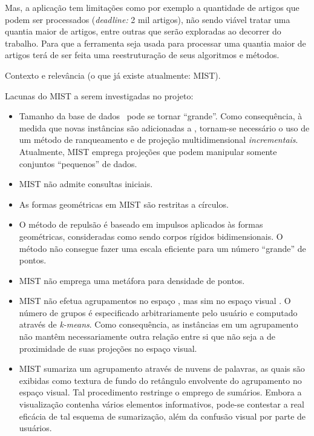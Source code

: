  Mas, a aplicação tem limitações como por exemplo a quantidade de artigos que podem ser processados (\textit{deadline:} 2 mil artigos), não sendo viável tratar uma quantia maior de artigos, entre outras que serão exploradas ao decorrer do trabalho. Para que a ferramenta seja usada para processar uma quantia maior de artigos terá de ser feita uma reestruturação de seus algoritmos e métodos.

Contexto e relevância (o que já existe atualmente: MIST).

Lacunas do MIST a serem investigadas no projeto:
\begin{itemize}
	\item Tamanho da base de dados \DB\ pode se tornar ``grande''. Como consequência, à medida que novas instâncias são adicionadas a \DB,
	tornam-se necessário o uso de um método de ranqueamento e de projeção
	multidimensional \emph{incrementais}. Atualmente, MIST emprega
	projeções que podem manipular somente conjuntos ``pequenos'' de
	dados.
	
	\item MIST não admite consultas iniciais.
	
	\item As formas geométricas em MIST são restritas a círculos.
	
	\item O método de repulsão é baseado em impulsos aplicados às formas
	geométricas, consideradas como sendo corpos rígidos
	bidimensionais. O método não consegue fazer uma escala eficiente para um número
	``grande'' de pontos.
	
	\item MIST não emprega uma metáfora para densidade de pontos.
	
	\item MIST não efetua agrupamentos no espaço , mas sim no
	espaço visual . O número de grupos é especificado
	arbitrariamente pelo usuário e computado através de
	\emph{k-means}. Como consequência, as instâncias em um agrupamento
	não mantêm necessariamente outra relação entre si que não seja a de
	proximidade de suas projeções no espaço visual.
	
	\item MIST sumariza um agrupamento através de nuvens de palavras, as quais são exibidas como textura de fundo do retângulo envolvente do agrupamento no espaço visual. Tal procedimento restringe o emprego	de sumários. Embora a visualização contenha vários elementos
	informativos, pode-se contestar a real eficácia de tal esquema de	sumarização, além da confusão visual por parte de usuários.
	
\end{itemize}



